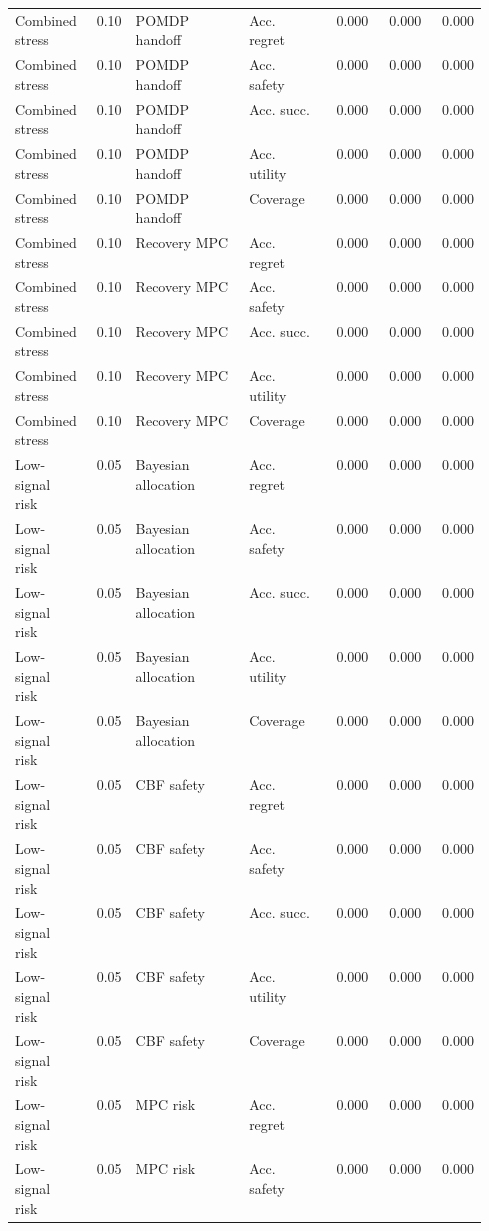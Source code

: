 \documentclass{article}
\begin{document}
\begin{center}
\begin{longtable}{p{0.14\linewidth}rp{0.24\linewidth}p{0.17\linewidth}rrr}
Combined stress & 0.10 & POMDP handoff & Acc. regret & 0.000 & 0.000 & 0.000\\
Combined stress & 0.10 & POMDP handoff & Acc. safety & 0.000 & 0.000 & 0.000\\
Combined stress & 0.10 & POMDP handoff & Acc. succ. & 0.000 & 0.000 & 0.000\\
Combined stress & 0.10 & POMDP handoff & Acc. utility & 0.000 & 0.000 & 0.000\\
Combined stress & 0.10 & POMDP handoff & Coverage & 0.000 & 0.000 & 0.000\\
Combined stress & 0.10 & Recovery MPC & Acc. regret & 0.000 & 0.000 & 0.000\\
Combined stress & 0.10 & Recovery MPC & Acc. safety & 0.000 & 0.000 & 0.000\\
Combined stress & 0.10 & Recovery MPC & Acc. succ. & 0.000 & 0.000 & 0.000\\
Combined stress & 0.10 & Recovery MPC & Acc. utility & 0.000 & 0.000 & 0.000\\
Combined stress & 0.10 & Recovery MPC & Coverage & 0.000 & 0.000 & 0.000\\
Low-signal risk & 0.05 & Bayesian allocation & Acc. regret & 0.000 & 0.000 & 0.000\\
Low-signal risk & 0.05 & Bayesian allocation & Acc. safety & 0.000 & 0.000 & 0.000\\
Low-signal risk & 0.05 & Bayesian allocation & Acc. succ. & 0.000 & 0.000 & 0.000\\
Low-signal risk & 0.05 & Bayesian allocation & Acc. utility & 0.000 & 0.000 & 0.000\\
Low-signal risk & 0.05 & Bayesian allocation & Coverage & 0.000 & 0.000 & 0.000\\
Low-signal risk & 0.05 & CBF safety & Acc. regret & 0.000 & 0.000 & 0.000\\
Low-signal risk & 0.05 & CBF safety & Acc. safety & 0.000 & 0.000 & 0.000\\
Low-signal risk & 0.05 & CBF safety & Acc. succ. & 0.000 & 0.000 & 0.000\\
Low-signal risk & 0.05 & CBF safety & Acc. utility & 0.000 & 0.000 & 0.000\\
Low-signal risk & 0.05 & CBF safety & Coverage & 0.000 & 0.000 & 0.000\\
Low-signal risk & 0.05 & MPC risk & Acc. regret & 0.000 & 0.000 & 0.000\\
Low-signal risk & 0.05 & MPC risk & Acc. safety & 0.000 & 0.000 & 0.000\\

\end{longtable}
\end{center}
\end{document}
